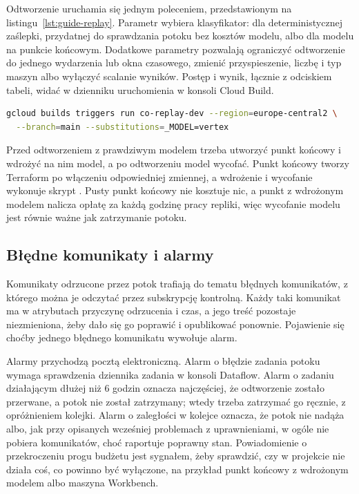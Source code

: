 Odtworzenie uruchamia się jednym poleceniem, przedstawionym na listingu~\ref{lst:guide-replay}.
Parametr  wybiera klasyfikator:  dla deterministycznej zaślepki, przydatnej do sprawdzania potoku bez kosztów modelu, albo  dla modelu na punkcie końcowym.
Dodatkowe parametry pozwalają ograniczyć odtworzenie do jednego wydarzenia lub okna czasowego, zmienić przyspieszenie, liczbę i typ maszyn albo wyłączyć scalanie wyników.
Postęp i wynik, łącznie z odciskiem tabeli, widać w dzienniku uruchomienia w konsoli Cloud Build.

\begin{lstlisting}[float=hbp, language=bash, caption={Uruchomienie odtworzenia z modelem na punkcie końcowym}, label={lst:guide-replay}]
gcloud builds triggers run co-replay-dev --region=europe-central2 \
  --branch=main --substitutions=_MODEL=vertex
\end{lstlisting}

Przed odtworzeniem z prawdziwym modelem trzeba utworzyć punkt końcowy i wdrożyć na nim model, a po odtworzeniu model wycofać.
Punkt końcowy tworzy Terraform po włączeniu odpowiedniej zmiennej, a wdrożenie i wycofanie wykonuje skrypt .
Pusty punkt końcowy nie kosztuje nic, a punkt z wdrożonym modelem nalicza opłatę za każdą godzinę pracy repliki, więc wycofanie modelu jest równie ważne jak zatrzymanie potoku.

\subsection{Błędne komunikaty i alarmy}
\label{sec:guide-alarms}

Komunikaty odrzucone przez potok trafiają do tematu błędnych komunikatów, z którego można je odczytać przez subskrypcję kontrolną.
Każdy taki komunikat ma w atrybutach przyczynę odrzucenia i czas, a jego treść pozostaje niezmieniona, żeby dało się go poprawić i opublikować ponownie.
Pojawienie się choćby jednego błędnego komunikatu wywołuje alarm.

Alarmy przychodzą pocztą elektroniczną.
Alarm o błędzie zadania potoku wymaga sprawdzenia dziennika zadania w konsoli Dataflow.
Alarm o zadaniu działającym dłużej niż 6 godzin oznacza najczęściej, że odtworzenie zostało przerwane, a potok nie został zatrzymany; wtedy trzeba zatrzymać go ręcznie, z opróżnieniem kolejki.
Alarm o zaległości w kolejce oznacza, że potok nie nadąża albo, jak przy opisanych wcześniej problemach z uprawnieniami, w ogóle nie pobiera komunikatów, choć raportuje poprawny stan.
Powiadomienie o przekroczeniu progu budżetu jest sygnałem, żeby sprawdzić, czy w projekcie nie działa coś, co powinno być wyłączone, na przykład punkt końcowy z wdrożonym modelem albo maszyna Workbench.

